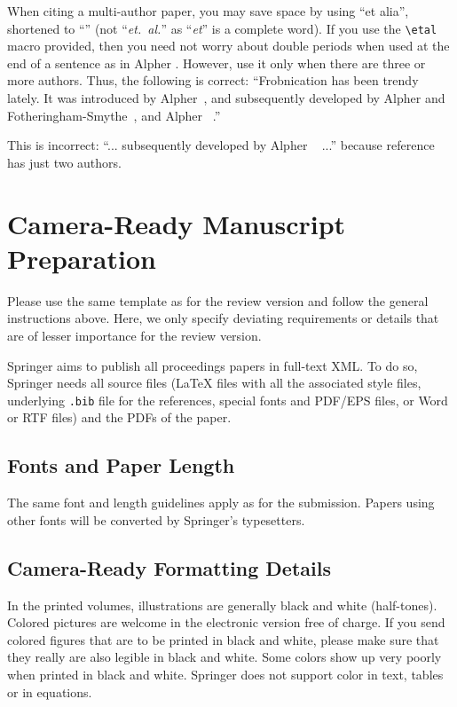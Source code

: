 \documentclass[runningheads]{llncs}
\begin{document}
When citing a multi-author paper, you may save space by using ``et alia'', shortened to ``\etal'' (not ``{\em et.\ al.}'' as ``{\em et}'' is a complete word).
If you use the \verb'\etal' macro provided, then you need not worry about double periods when used at the end of a sentence as in Alpher \etal.
However, use it only when there are three or more authors.
Thus, the following is correct:
   ``Frobnication has been trendy lately.
   It was introduced by Alpher~\cite{Alpher02}, and subsequently developed by
   Alpher and Fotheringham-Smythe~\cite{Alpher03}, and Alpher \etal~\cite{Alpher04}.''

This is incorrect: ``... subsequently developed by Alpher \etal~\cite{Alpher03} ...'' because reference~\cite{Alpher03} has just two authors.


\section{Camera-Ready Manuscript Preparation}
\label{sec:manuscript}

Please use the same template as for the review version and follow the general instructions above.
Here, we only specify deviating requirements or details that are of lesser importance for the review version.

Springer aims to publish all proceedings papers in full-text XML. 
To do so, Springer needs all source files (\LaTeX{} files with all the associated style files, underlying \texttt{.bib} file for the references, special fonts and PDF/EPS files, or Word or RTF files) and the PDFs of the paper. 

\subsection{Fonts and Paper Length}
The same font and length guidelines apply as for the submission.
Papers using other fonts will be converted by Springer's typesetters.

\subsection{Camera-Ready Formatting Details}
In the printed volumes, illustrations are generally black and white (half-tones). 
Colored pictures are welcome in the electronic version free of charge. 
If you send colored figures that are to be printed in black and white, please make sure that they really are also legible in black and white. 
Some colors show up very poorly when printed in black and white. 
Springer does not support color in text, tables or in equations.
\end{document}
